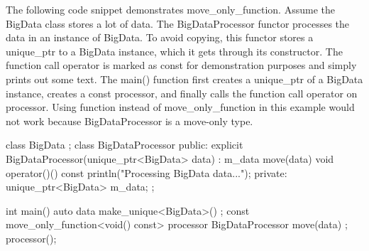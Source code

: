 The following code snippet demonstrates move\_only\_function. Assume the BigData class stores a lot of data. The BigDataProcessor functor processes the data in an instance of BigData. To avoid copying, this functor stores a unique\_ptr to a BigData instance, which it gets through its constructor. The function call operator is marked as const for demonstration purposes and simply prints out some text. The main() function first creates a unique\_ptr of a BigData instance, creates a const processor, and finally calls the function call operator on processor. Using function instead of move\_only\_function in this example would not work because BigDataProcessor is a move-only type.

\begin{cpp}
class BigData {};
class BigDataProcessor
{
    public:
        explicit BigDataProcessor(unique_ptr<BigData> data)
            : m_data { move(data) } { }
        void operator()() const { println("Processing BigData data..."); }
    private:
     unique_ptr<BigData> m_data;
};

int main()
{
    auto data { make_unique<BigData>() };
    const move_only_function<void() const> processor {
        BigDataProcessor { move(data) } };
    processor();
}
\end{cpp}





























